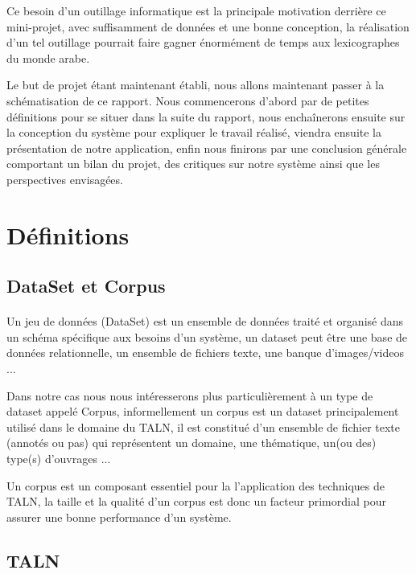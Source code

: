 \documentclass[]{report}
\begin{document}
		\par
		Ce besoin d'un outillage informatique est la principale motivation derrière ce mini-projet, avec suffisamment de données et une bonne conception, la réalisation d'un tel outillage pourrait faire gagner énormément de temps aux lexicographes du monde arabe.
		\par 
		Le but de projet étant maintenant établi, nous allons maintenant passer à la schématisation de ce rapport. Nous commencerons d'abord par de petites définitions pour se situer dans la suite du rapport, nous enchaînerons ensuite sur la conception du système pour expliquer le travail réalisé, viendra ensuite la présentation de notre application, enfin nous finirons par une conclusion générale comportant un bilan du projet, des critiques sur notre système ainsi que les perspectives envisagées.
	\section{Définitions}
		\subsection{DataSet et Corpus}
		\paragraph{}
		Un jeu de données (DataSet) est un ensemble de données traité et organisé dans un schéma spécifique aux besoins d'un système, un dataset peut être une base de données relationnelle, un ensemble de fichiers texte, une banque d'images/videos ...
		\par Dans notre cas nous nous intéresserons plus particulièrement à un type de dataset appelé Corpus, informellement un corpus est un dataset principalement utilisé dans le domaine du TALN, il est constitué d'un ensemble de fichier texte (annotés ou pas) qui représentent un domaine, une thématique, un(ou des) type(s) d'ouvrages ...
		\par Un corpus est un composant essentiel pour la l'application des techniques de TALN, la taille et la qualité d'un corpus est donc un facteur primordial pour assurer une bonne performance d'un système.
		\subsection{TALN}
\end{document}
